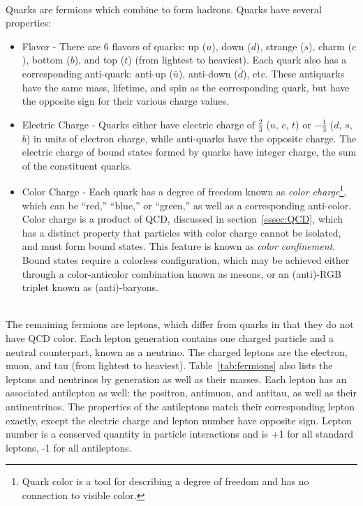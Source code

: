         \\
        \indent Quarks are fermions which combine to form hadrons. Quarks have several properties:
        \begin{itemize}
            \item Flavor - There are 6 flavors of quarks: up ($u$), down ($d$), strange ($s$), charm ($c$), bottom ($b$), and top ($t$) (from lightest to heaviest). Each quark also has a corresponding anti-quark: anti-up ($\bar{u}$), anti-down ($\bar{d}$), etc. These antiquarks have the same mass, lifetime, and spin as the corresponding quark, but have the opposite sign for their various charge values.
            \item Electric Charge - Quarks either have electric charge of $\frac{2}{3}$ ($u$, $c$, $t$) or $-\frac{1}{3}$ ($d$, $s$, $b$) in units of electron charge, while anti-quarks have the opposite charge. The electric charge of bound states formed by quarks have integer charge, the sum of the constituent quarks.
            \item Color Charge - Each quark has a degree of freedom known as \textit{color charge}\footnote{Quark color is a tool for describing a degree of freedom and has no connection to visible color.}, which can be ``red,'' ``blue,'' or ``green,'' as well as a corresponding anti-color. Color charge is a product of \gls{QCD}, discussed in section~\ref{sssec:QCD}, which has a distinct property that particles with color charge cannot be isolated, and must form bound states. This feature is known as \textit{color confinement}. Bound states require a colorless configuration, which may be achieved either through a color-anticolor combination known as mesons, or an (anti)-RGB triplet known as (anti)-baryons. 
        \end{itemize}

        \\
        \indent The remaining fermions are leptons, which differ from quarks in that they do not have \gls{QCD} color. Each lepton generation contains one charged particle and a neutral counterpart, known as a neutrino. The charged leptons are the electron, muon, and tau (from lightest to heaviest). Table~\ref{tab:fermions} also lists the leptons and neutrinos by generation as well as their masses. Each lepton has an associated antilepton as well: the positron, antimuon, and antitau, as well as their antineutrinos. The properties of the antileptons match their corresponding lepton exactly, except the electric charge and lepton number have opposite sign. Lepton number is a conserved quantity in particle interactions and is +1 for all standard leptons, -1 for all antileptons.

